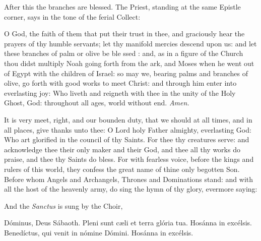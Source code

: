 \begin{rubric}
    After this the branches are blessed. The Priest, standing at the same Epistle corner, says in the tone of the ferial Collect:
\end{rubric}
{} O God, the faith of them that put their trust in thee, and graciously hear the prayers of thy humble servants; let thy manifold mercies descend upon us: and let these branches of palm or olive be ble {} ssed : and, as in a figure of the Church thou didst multiply Noah going forth from the ark, and Moses when he went out of Egypt with the children of Israel: so may we, bearing palms and branches of olive, go forth with good works to meet Christ: and through him enter into everlasting joy: Who liveth and reigneth with thee in the unity of the Holy Ghost, God: throughout all ages, world without end. \textit{Amen.}
\par\noindent
It is very meet, right, and our bounden duty, that we should at all times, and in all places, give thanks unto thee: O Lord holy Father almighty, everlasting God: Who art glorified in the council of thy Saints. For thee thy creatures serve: and acknowledge thee their only maker and their God, and thee all thy works do praise, and thee thy Saints do bless. For with fearless voice, before the kings and rulers of this world, they confess the great name of thine only begotten Son. Before whom Angels and Archangels, Thrones and Dominations stand: and with all the host of the heavenly army, do sing the hymn of thy glory, evermore saying:
\begin{rubric}
    And the \emph{Sanctus} is sung by the Choir,
\end{rubric}
{ Dóminus, Deus Sábaoth. Pleni sunt c{\ae}li et terra glória tua. Hosánna in excélsis. Benedíctus, {} qui venit in nómine Dómini. Hosánna in excélsis.}
